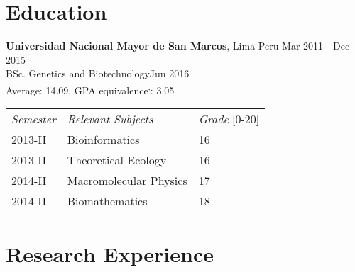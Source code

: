 \documentclass[margin,line]{res}
\begin{document}
\begin{resume}

\section{\sc Education}
{\bf Universidad Nacional Mayor de San Marcos}, Lima-Peru \hfill Mar 2011 - Dec 2015\\
BSc. Genetics and Biotechnology\hfill Jun 2016\\
Average: 14.09. GPA equivalence\footnotemark\textsuperscript{,}\footnotemark: 3.05\\%

\begin{center}
	\vspace{-9mm}
	\begin{tabular}{lll}
		\textit{Semester} & \textit{Relevant Subjects} & \textit{Grade} [0-20] \\
		2013-II & Bioinformatics & 16\\
		2013-II & Theoretical Ecology & 16\\
		2014-II & Macromolecular Physics & 17\\
		2014-II & Biomathematics & 18\\
	\end{tabular}
	\vspace{4mm}
\end{center}


\section{\sc Research Experience}


\end{resume}
\end{document}
